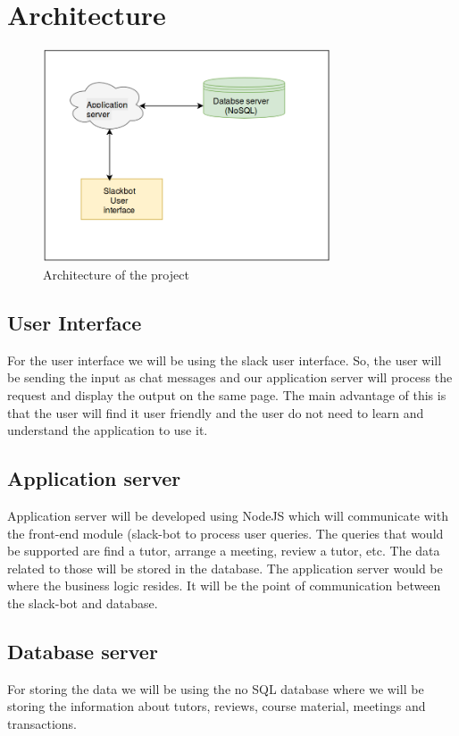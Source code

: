 \documentclass{sig-alternate-05-2015}
\begin{document}
\section{Architecture}
\begin{figure}[ht]
\centering
\includegraphics[width=85mm]{pic.png}
\caption{Architecture of the project}
\end{figure}

\subsection{User Interface}
For the user interface we will be using the slack user interface. So, the user will be sending the input as chat messages and our application server will process the request and display the output on the same page. The main advantage of this is that the user will find it user friendly and the user do not need to learn and understand the application to use it.

\subsection{Application server}
Application server will be developed using NodeJS which will communicate with the front-end module (slack-bot to process user queries. The queries that would be supported are find a tutor, arrange a meeting, review a tutor, etc. The data related to those will be stored in the database. The application server would be where the business logic resides. It will be the point of communication between the slack-bot and database.

\subsection{Database server}
For storing the data we will be using the no SQL database where we will be storing the information about tutors, reviews, course material, meetings and transactions. 
\end{document}

